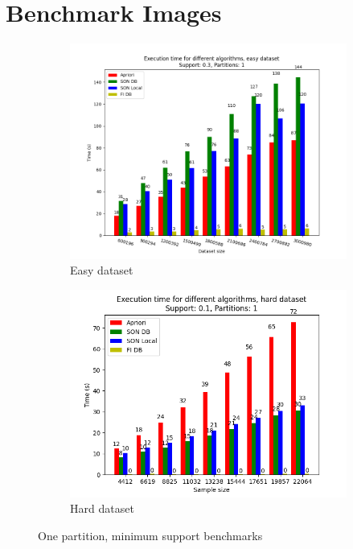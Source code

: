 \documentclass[a4paper]{article}
\begin{document}
	\section{Benchmark Images}

	\begin{figure}[h]
		\centering
		\begin{subfigure}[b]{\textwidth}
			\centering
			\includegraphics[width=\textwidth]{1_easy_0,3_1_dataset.png}
         	\caption{Easy dataset}
		\end{subfigure}
		\hfill		
		\begin{subfigure}[b]{\textwidth}
			\centering
			\includegraphics[width=\textwidth]{1_hard_0,1_1_dataset.png}
         	\caption{Hard dataset}
		\end{subfigure}
		\hfill

		\caption{One partition, minimum support benchmarks}
		\label{fig:1par-minsup}
		
	\end{figure}
	
\end{document}

